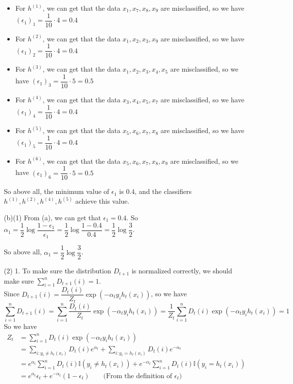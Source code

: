 \begin{itemize}
    \item For $h^{(1)}$, we can get that the data $x_1, x_7, x_8, x_9$ are misclassified, so we have
    $(\epsilon_1)_1=\dfrac{1}{10}\cdot 4=0.4$

    \item For $h^{(2)}$, we can get that the data $x_1, x_2, x_3, x_9$ are misclassified, so we have
    $(\epsilon_1)_2=\dfrac{1}{10}\cdot 4=0.4$

    \item For $h^{(3)}$, we can get that the data $x_1, x_2, x_3, x_4, x_5$ are misclassified, so we have
    $(\epsilon_1)_3=\dfrac{1}{10}\cdot 5=0.5$

    \item For $h^{(4)}$, we can get that the data $x_3, x_4, x_5, x_7$ are misclassified, so we have
    $(\epsilon_1)_4=\dfrac{1}{10}\cdot 4=0.4$

    \item For $h^{(5)}$, we can get that the data $x_5, x_6, x_7, x_8$ are misclassified, so we have
    $(\epsilon_1)_5=\dfrac{1}{10}\cdot 4=0.4$

    \item For $h^{(6)}$, we can get that the data $x_5, x_6, x_7, x_8, x_9$ are misclassified, so we have
    $(\epsilon_1)_6=\dfrac{1}{10}\cdot 5=0.5$
\end{itemize}

So above all, the minimum value of $\epsilon_1$ is $0.4$, and the classifiers $h^{(1)}, h^{(2)}, h^{(4)}, h^{(5)}$ achieve this value.

(b)(1) From (a), we can get that $\epsilon_1=0.4$.
So $\alpha_1=\dfrac{1}{2}\log\dfrac{1-\epsilon_1}{\epsilon_1}=\dfrac{1}{2}\log\dfrac{1-0.4}{0.4}=\dfrac{1}{2}\log\dfrac{3}{2}$.

So above all, $\alpha_1=\dfrac{1}{2}\log\dfrac{3}{2}$.

(2) 1. To make sure the distribution $D_{t+1}$ is normalized correctly, we should make sure $\sum\limits_{i=1}^{n} D_{t+1}(i) = 1$. \\
Since $D_{t+1}(i)=\dfrac{D_{t}(i)}{Z_t}\exp\left(-\alpha_ty_ih_t(x_i)\right)$, so we have
$$\sum_{i=1}^{n} D_{t+1}(i)=\sum_{i=1}^{n}\dfrac{D_{t}(i)}{Z_t}\exp\left(-\alpha_ty_ih_t(x_i)\right)=\dfrac{1}{Z_t}\sum_{i=1}^{n}D_{t}(i)\exp(-\alpha_ty_ih_t(x_i))=1$$
So we have
\begin{align*}
Z_t &= \sum_{i=1}^{n}D_{t}(i)\exp\left(-\alpha_ty_ih_t(x_i)\right) \\
&= \sum_{i:y_i\neq h_t(x_i)}D_{t}(i)e^{\alpha_t}+\sum_{i:y_i=h_t(x_i)}D_{t}(i)e^{-\alpha_t} \\
&= e^{\alpha_t}\sum_{i=1}^{n}D_{t}(i)\mathbb{I}(y_{i} \neq h_{t}(x_{i}))+e^{-\alpha_t}\sum_{i=1}^{n}D_{t}(i)\mathbb{I}(y_{i} = h_{t}(x_{i})) \\
&= e^{\alpha_t}\epsilon_t+e^{-\alpha_t}(1-\epsilon_t) \qquad \text{(From the definition of $\epsilon_t$)}
\end{align*}

